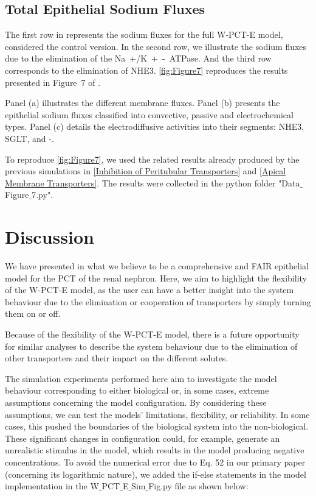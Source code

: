 \documentclass[fleqn,10pt]{physiome}
\begin{document}
\subsection{Total Epithelial Sodium Fluxes}

The first row in \cite[Figure 7]{noroozbabaee2022modular} represents the sodium fluxes for the full W-PCT-E model, considered the control version. In the second row, we illustrate the sodium fluxes due to the elimination of the \si{Na+/K+-ATPase}. And the third row corresponds to the elimination of NHE3. \autoref{fig:Figure7}  reproduces the results presented in Figure~7 of \cite{noroozbabaee2022modular}.

Panel (a) illustrates the different membrane fluxes. Panel (b) presents the epithelial sodium fluxes classified into convective, passive and electrochemical types. Panel (c) details the electrodiffusive activities into their segments: NHE3, SGLT, and -. 

To reproduce \autoref{fig:Figure7}, we used the related results already produced by the previous simulations in \autoref{Inhibition of Peritubular Transporters} and \autoref{Apical Membrane Transporters}.  The results were collected in the python folder "Data$\_$Figure$\_$7.py".


\section{Discussion}
We have presented in \cite{noroozbabaee2022modular} what we believe to be a comprehensive and FAIR epithelial model for the PCT of the renal nephron.
Here, we aim to highlight the flexibility of the W-PCT-E model, as the user can have a better insight into the system behaviour due to the elimination or cooperation of transporters by simply turning them on or off.

Because of the flexibility of the W-PCT-E model, there is a future opportunity for similar analyses to describe the system behaviour due to the elimination of other transporters and their impact on the different solutes. 

The simulation experiments performed here aim to investigate the model behaviour corresponding to either biological or, in some cases, extreme assumptions concerning the model configuration. By considering these assumptions, we can test the models' limitations, flexibility, or reliability. 
In some cases, this pushed the boundaries of the biological system into the non-biological. These significant changes in configuration could, for example, generate an unrealistic stimulus in the model, which results in the model producing negative concentrations. To avoid the numerical error due to Eq. 52 in our primary paper (concerning its logarithmic nature), we added the if-else statements in the model implementation in the W$\_$PCT$\_$E$\_$Sim$\_$Fig.py file as shown below: 
\end{document}

